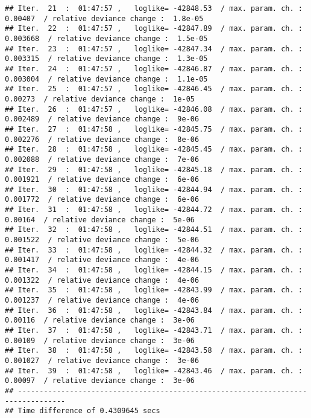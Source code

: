 \documentclass[]{article}
\newenvironment{Shaded}{\begin{snugshade}}{\end{snugshade}}
\newcommand{\NormalTok}[1]{#1}
\newcommand{\OperatorTok}[1]{\textcolor[rgb]{0.81,0.36,0.00}{\textbf{#1}}}
\begin{document}
\begin{verbatim}
## Iter.  21  :  01:47:57 ,   loglike= -42848.53  / max. param. ch. :  0.00407  / relative deviance change :  1.8e-05
## Iter.  22  :  01:47:57 ,   loglike= -42847.89  / max. param. ch. :  0.003668  / relative deviance change :  1.5e-05
## Iter.  23  :  01:47:57 ,   loglike= -42847.34  / max. param. ch. :  0.003315  / relative deviance change :  1.3e-05
## Iter.  24  :  01:47:57 ,   loglike= -42846.87  / max. param. ch. :  0.003004  / relative deviance change :  1.1e-05
## Iter.  25  :  01:47:57 ,   loglike= -42846.45  / max. param. ch. :  0.00273  / relative deviance change :  1e-05
## Iter.  26  :  01:47:57 ,   loglike= -42846.08  / max. param. ch. :  0.002489  / relative deviance change :  9e-06
## Iter.  27  :  01:47:58 ,   loglike= -42845.75  / max. param. ch. :  0.002276  / relative deviance change :  8e-06
## Iter.  28  :  01:47:58 ,   loglike= -42845.45  / max. param. ch. :  0.002088  / relative deviance change :  7e-06
## Iter.  29  :  01:47:58 ,   loglike= -42845.18  / max. param. ch. :  0.001921  / relative deviance change :  6e-06
## Iter.  30  :  01:47:58 ,   loglike= -42844.94  / max. param. ch. :  0.001772  / relative deviance change :  6e-06
## Iter.  31  :  01:47:58 ,   loglike= -42844.72  / max. param. ch. :  0.00164  / relative deviance change :  5e-06
## Iter.  32  :  01:47:58 ,   loglike= -42844.51  / max. param. ch. :  0.001522  / relative deviance change :  5e-06
## Iter.  33  :  01:47:58 ,   loglike= -42844.32  / max. param. ch. :  0.001417  / relative deviance change :  4e-06
## Iter.  34  :  01:47:58 ,   loglike= -42844.15  / max. param. ch. :  0.001322  / relative deviance change :  4e-06
## Iter.  35  :  01:47:58 ,   loglike= -42843.99  / max. param. ch. :  0.001237  / relative deviance change :  4e-06
## Iter.  36  :  01:47:58 ,   loglike= -42843.84  / max. param. ch. :  0.00116  / relative deviance change :  3e-06
## Iter.  37  :  01:47:58 ,   loglike= -42843.71  / max. param. ch. :  0.00109  / relative deviance change :  3e-06
## Iter.  38  :  01:47:58 ,   loglike= -42843.58  / max. param. ch. :  0.001027  / relative deviance change :  3e-06
## Iter.  39  :  01:47:58 ,   loglike= -42843.46  / max. param. ch. :  0.00097  / relative deviance change :  3e-06
## ---------------------------------------------------------------------------------
## Time difference of 0.4309645 secs
\end{verbatim}

\begin{Shaded}
\end{Shaded}
\end{document}
